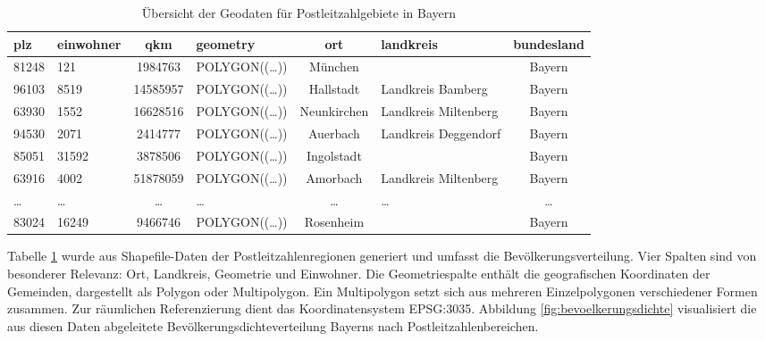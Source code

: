 \begin{table}[htbp]
    \centering
    \small  %
    \caption{Übersicht der Geodaten für Postleitzahlgebiete in Bayern}
    \label{tab:geodaten}
    \begin{tabularx}{\textwidth}{lXcXcXc}
        \toprule
        \textbf{plz} & \textbf{einwohner} & \textbf{qkm} & \textbf{geometry} & \textbf{ort} & \textbf{landkreis} & \textbf{bundesland} \\
        \midrule
        81248 & 121  & 1984763  & POLYGON((…)) & München & & Bayern \\
        96103 & 8519 & 14585957   & POLYGON((…)) & Hallstadt & Landkreis Bamberg & Bayern \\
        63930 & 1552 & 16628516 & POLYGON((…)) & Neunkirchen & Landkreis Miltenberg & Bayern \\
        94530 & 2071 & 2414777 & POLYGON((…)) & Auerbach & Landkreis Deggendorf & Bayern \\
        85051 & 31592 & 3878506 & POLYGON((…)) & Ingolstadt & & Bayern \\
        63916 & 4002 & 51878059 & POLYGON((…)) & Amorbach & Landkreis Miltenberg & Bayern \\
        \dots & \dots & \dots & \dots & \dots & \dots & \dots \\
        83024 & 16249 & 9466746 & POLYGON((…)) & Rosenheim & & Bayern \\
        \bottomrule
    \end{tabularx}
\end{table}
\FloatBarrier

Tabelle \ref{tab:geodaten} wurde aus Shapefile-Daten der Postleitzahlenregionen generiert und umfasst die Bevölkerungsverteilung. Vier Spalten sind von besonderer Relevanz: Ort, Landkreis, Geometrie und Einwohner. Die Geometriespalte enthält die geografischen Koordinaten der Gemeinden, dargestellt als Polygon oder Multipolygon. Ein Multipolygon setzt sich aus mehreren Einzelpolygonen verschiedener Formen zusammen. Zur räumlichen Referenzierung dient das Koordinatensystem EPSG:3035. Abbildung \ref{fig:bevoelkerungsdichte} visualisiert die aus diesen Daten abgeleitete Bevölkerungsdichteverteilung Bayerns nach Postleitzahlenbereichen.


